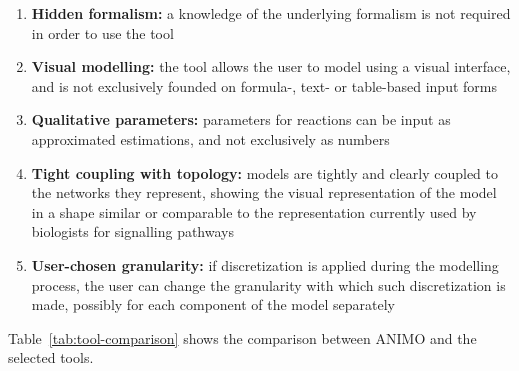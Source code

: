 \begin{enumerate}
  \item {\bf Hidden formalism:} a knowledge of the underlying formalism is not required in order to use the tool
  \item {\bf Visual modelling:} the tool allows the user to model using a visual interface, and is not exclusively
      founded on formula-, text- or table-based input forms
  \item {\bf Qualitative parameters:} parameters for reactions can be input as approximated estimations, and not exclusively as numbers
  \item {\bf Tight coupling with topology:} models are tightly and clearly coupled to the networks they represent, showing the visual
      representation of the model in a shape similar or comparable to the representation currently used by biologists
      for signalling pathways
  \item {\bf User-chosen granularity:} if discretization is applied during the modelling process, the user can change the granularity
      with which such discretization is made, possibly for each component of the model separately
\end{enumerate}
Table~\ref{tab:tool-comparison} shows the comparison between ANIMO and the selected tools.

